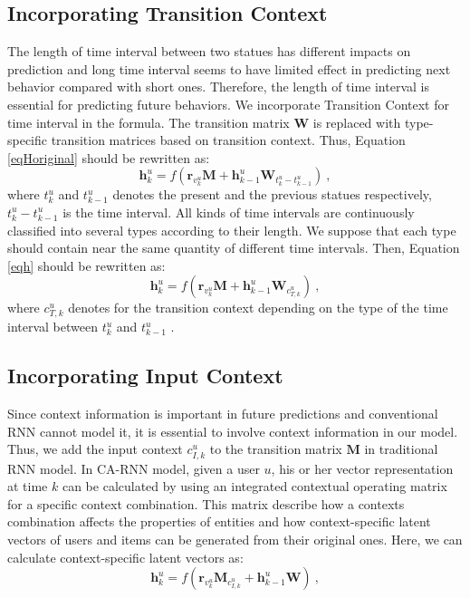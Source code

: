 \documentclass[conference]{IEEEtran}
\begin{document}
\subsection{ Incorporating Transition Context}
The length of time interval between two statues has different impacts on prediction and long time interval seems to have limited effect in predicting next behavior compared with short ones. Therefore, the length of time interval is essential for predicting future behaviors. We incorporate Transition Context for time interval in the formula. The transition matrix $\textbf{W}$ is replaced with type-specific transition matrices based on transition context. Thus, Equation \ref{eqHoriginal} should be rewritten as: 
\begin{equation}  \label{eqh}
\textbf{h}_{k}^{u}=f\left ( \textbf{r}_{v_{k}^{u}}\textbf{M}+\textbf{h}_{k-1}^{u}\textbf{W}_{ t_k^u-t_{k-1}^u  }\right )~,
\end{equation}
 where $t_k^u$ and $t_{k-1}^u$ denotes the present and the previous statues respectively, $t_k^u-t_{k-1}^u$ is the time interval.  All kinds of time intervals are continuously classified into several types according to their length. We suppose that each type should contain near the same quantity of different time intervals. Then, Equation \ref{eqh} should be rewritten as: 
\begin{equation}  
\textbf{h}_{k}^{u}=f\left ( \textbf{r}_{v_{k}^{u}}\textbf{M}+\textbf{h}_{k-1}^{u}\textbf{W}_{c_{T,k}^{u}}\right )~,
\end{equation}
where $c_{T,k}^{u}$ denotes for the transition context depending on the type of the time interval between $t_k^u$ and $t_{k-1}^u$ .



\subsection{Incorporating Input Context}
Since context information is important in future predictions and conventional RNN cannot model it, it is essential to involve context information in our model. Thus, we add the input context $c_{I,k}^{u}$ to the transition matrix $\textbf{M}$ in traditional RNN model. In CA-RNN model, given a user $u$, his or her vector representation at time $k$ can be calculated by using an integrated contextual operating matrix for a specific context combination. This matrix describe how a contexts combination affects the properties of entities and how context-specific latent vectors of users and items can be generated from their original ones. Here, we can calculate context-specific latent vectors as: 
\begin{equation}\label{eqHt}
\textbf{h}_{k}^{u}=f\left ( \textbf{r}_{v_{k}^{u}}\textbf{M}_{c_{I,k}^{u}}+\textbf{h}_{k-1}^{u}\textbf{W}\right )~,
\end{equation}
\end{document}
